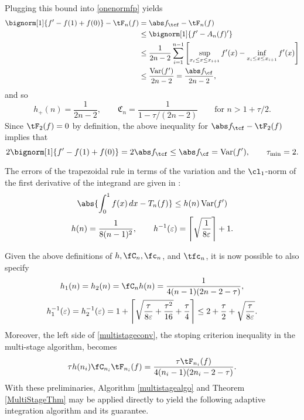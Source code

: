 Plugging this bound into \eqref{onenormfp} yields
\begin{align*}
\bignorm[1]{f'-f(1)+f(0)} - \tF_n(f) &= \Ftnorm{f} - \tF_{n}(f)\\
 & \le \bignorm[1]{f' -A_n(f)'}\\
&\le \frac{1}{2n-2} \sum_{i=1}^{n-1} \left[ \sup_{x_i \le x \le x_{i+1}} f'(x) - \inf_{x_i \le x \le x_{i+1}} f'(x) \right] \\
& \le \frac{\Var(f')}{2n-2} = \frac{\Fnorm{f}}{2n-2},
\end{align*}
and so 
\begin{equation*}\label{factor}
h_{+}(n)= \frac{1}{2n-2}, \qquad \mathfrak{C}_n =\frac{1}{1 - \tau/(2n-2)} \qquad \text{for } n>1+\tau/2.
\end{equation*}
Since $\tF_2(f)=0$ by definition, the above inequality for $\Ftnorm{f} - \tF_{2}(f)$ implies that
\begin{equation*} \label{taumininteg}
2\bignorm[1]{f'-f(1)+f(0)} = 2 \Ftnorm{f} \le \Fnorm{f} = \Var(f'), \qquad \tau_{\min}=2.
\end{equation*}

The errors of the trapezoidal rule in terms of the variation and the $\cl_1$-norm of the first derivative of the integrand are given in \cite[(7.15)???]{BraPet11a}:
\begin{gather*}
\abs{\int_0^1 f(x) \, dx - T_n(f)} \le h(n) \Var(f') \\
h(n)= \frac{1}{8(n-1)^2}, \qquad h^{-1}(\varepsilon) = \left \lceil \sqrt{\frac{1}{8\varepsilon}} \right \rceil +1.
\end{gather*}

Given the above definitions of $h, \fC_n, \fc_n$, and $\tfc_n$, it is now possible to also specify
\begin{gather*}
h_1(n) = h_2(n) = \fC_n h(n) = \frac{1}{4(n-1)(2n-2-\tau)}, \\
h_1^{-1}(\varepsilon) = h_2^{-1}(\varepsilon) = 1+ \left \lceil \sqrt{\frac{\tau}{8 \varepsilon} + \frac{\tau^2}{16}} +\frac{\tau}{4} \right \rceil \le 2 + \frac{\tau}{2} + \sqrt{\frac{\tau}{8\varepsilon}}.
\end{gather*}
Moreover, the left side of \eqref{multistageconv}, the stoping criterion inequality in the multi-stage algorithm, becomes
\begin{equation*}
\tau h(n_i)\fC_{n_i} \tF_{n_i}(f) = \frac{\tau  \tF_{n_i}(f) } {4(n_i-1)(2n_i-2 -\tau)}.
\end{equation*}
With these preliminaries, Algorithm \ref{multistagealgo} and Theorem \ref{MultiStageThm} may be applied directly to  yield the following adaptive integration algorithm and its guarantee.


